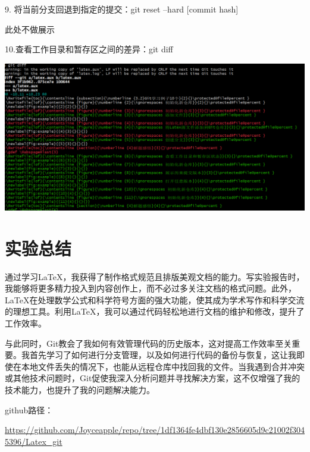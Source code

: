 \documentclass{article}
\begin{document}
	9. 将当前分支回退到指定的提交：git reset --hard [commit hash]
	
	此处不做展示
	
	10.查看工作目录和暂存区之间的差异：git diff
	
	\noindent
	\begin{minipage}{\linewidth}
		\centering
		\includegraphics[width=0.5\linewidth]{example10.png}
		\label{fig:example}
	\end{minipage}
	
	
	
	
	\section{实验总结}
	通过学习LaTeX，我获得了制作格式规范且排版美观文档的能力。写实验报告时，我能够将更多精力投入到内容创作上，而不必过多关注文档的格式问题。此外，LaTeX在处理数学公式和科学符号方面的强大功能，使其成为学术写作和科学交流的理想工具。利用LaTeX，我可以通过代码轻松地进行文档的维护和修改，提升了工作效率。
	
	与此同时，Git教会了我如何有效管理代码的历史版本，这对提高工作效率至关重要。我首先学习了如何进行分支管理，以及如何进行代码的备份与恢复，这让我即使在本地文件丢失的情况下，也能从远程仓库中找回我的文件。当我遇到合并冲突或其他技术问题时，Git促使我深入分析问题并寻找解决方案，这不仅增强了我的技术能力，也提升了我的问题解决能力。
	
	github路径：
	
	\url{https://github.com/Joyceapple/repo/tree/1df1364fe4dbf130e2856605d9c21002f3045396/Latex_git}
\end{document}

